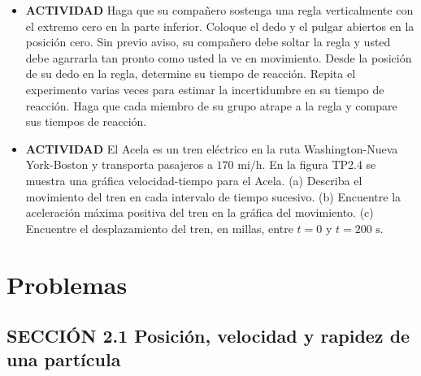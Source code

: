 \documentclass[11pt,a4paper]{article}
\begin{document}
\begin{itemize}
    \item[\textbf{3.}] \textbf{ACTIVIDAD} Haga que su compañero sostenga una regla verticalmente con el extremo cero en la parte inferior. Coloque el dedo y el pulgar abiertos en la posición cero. Sin previo aviso, su compañero debe soltar la regla y usted debe agarrarla tan pronto como usted la ve en movimiento. Desde la posición de su dedo en la regla, determine su tiempo de reacción. Repita el experimento varias veces para estimar la incertidumbre en su tiempo de reacción. Haga que cada miembro de su grupo atrape a la regla y compare sus tiempos de reacción.
    \vspace*{6cm}

    \item[\textbf{4.}] \textbf{ACTIVIDAD} El Acela es un tren eléctrico en la ruta Washington-Nueva York-Boston y transporta pasajeros a $170 \text{ mi/h}$. En la figura TP2.4 se muestra una gráfica velocidad-tiempo para el Acela. (a) Describa el movimiento del tren en cada intervalo de tiempo sucesivo. (b) Encuentre la aceleración máxima positiva del tren en la gráfica del movimiento. (c) Encuentre el desplazamiento del tren, en millas, entre $t = 0$ y $t = 200 \text{ s}$.
    \vspace*{9cm}
\end{itemize}

\newpage

\section*{Problemas}

\subsection*{SECCIÓN 2.1 Posición, velocidad y rapidez de una partícula}
\end{document}

